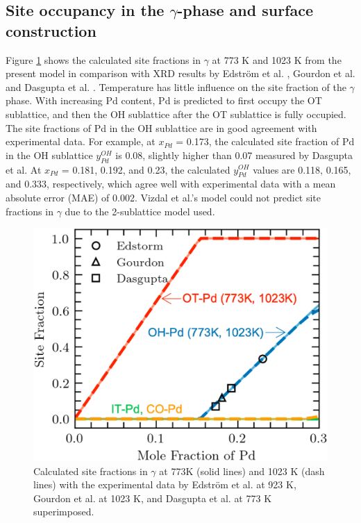 \subsection{Site occupancy in the \texorpdfstring{$\gamma$}--phase and surface construction} \label{intermetallics:ssec:PdZnsite}
Figure \ref{intermetallics:fig:PdZnSOC} shows the calculated site fractions in $\gamma$ at 773 K and 1023 K from the present model in comparison with XRD results by Edström et al. \cite{strom1969x}, Gourdon et al. \cite{gourdon2006intergrowth} and Dasgupta et al. \cite{Dasgupta2022}. Temperature has little influence on the site fraction of the $\gamma$ phase. With increasing Pd content, Pd is predicted to first occupy the OT sublattice, and then the OH sublattice after the OT sublattice is fully occupied. The site fractions of Pd in the OH sublattice are in good agreement with experimental data. For example, at $x_{Pd}$ = 0.173, the calculated site fraction of Pd in the OH sublattice $y_{Pd}^{OH}$ is 0.08, slightly higher than 0.07 measured by Dasgupta et al.\cite{Dasgupta2022} At $x_{Pd}$ = 0.181, 0.192, and 0.23, the calculated $y_{Pd}^{OH}$ values are 0.118, 0.165, and 0.333, respectively, which agree well with experimental data with a mean absolute error (MAE) of 0.002. Vizdal et al.'s \cite{vizdal2006experimental} model could not predict site fractions in $\gamma$ due to the 2-sublattice model used.

\begin{figure}[H]
    \centering
    \includegraphics[width=0.5\linewidth]{intermetallics/Intermetallics-PdZnSOC.jpg}
    \caption{Calculated site fractions in $\gamma$ at 773K (solid lines) and 1023 K (dash lines) with the experimental data by Edström et al. \cite{strom1969x} at 923 K, Gourdon et al. \cite{gourdon2006intergrowth} at 1023 K, and Dasgupta et al. \cite{Dasgupta2022} at 773 K superimposed.}
    \label{intermetallics:fig:PdZnSOC}
\end{figure}

